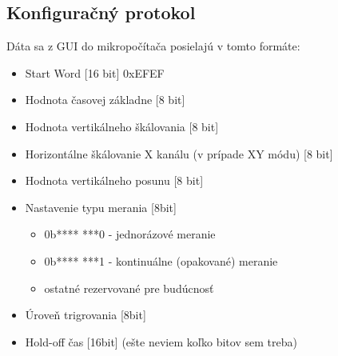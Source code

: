 \documentclass{article}
\begin{document}
	\subsection{Konfiguračný protokol}
	Dáta sa z GUI do mikropočítača posielajú v tomto formáte:
	\begin{itemize}
		\item Start Word [16 bit] 0xEFEF
		\item Hodnota časovej základne [8 bit]
		\item Hodnota vertikálneho škálovania [8 bit]	
		\item Horizontálne škálovanie X kanálu (v prípade XY módu) [8 bit]
		\item Hodnota vertikálneho posunu [8 bit]
		\item Nastavenie typu merania [8bit]
				\begin{itemize}		
					\item 	0b**** ***0 - jednorázové meranie
					\item 	0b**** ***1 - kontinuálne (opakované) meranie
					\item ostatné rezervované pre budúcnosť
				\end{itemize}
		\item Úroveň trigrovania [8bit]
		\item Hold-off čas [16bit] (ešte neviem koľko bitov sem treba)
		
	\end{itemize}
\end{document}
